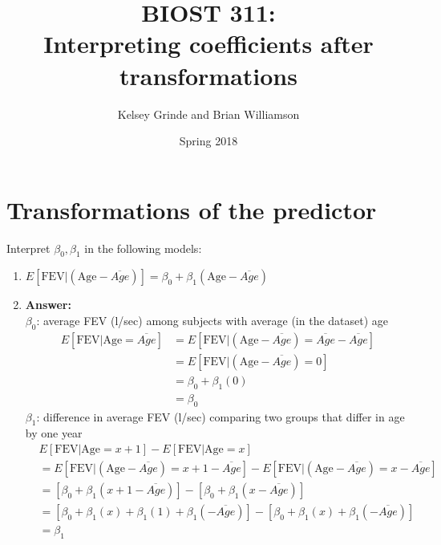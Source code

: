 \documentclass{article}
\begin{document}
\title{BIOST 311: \\ Interpreting coefficients after transformations}
\author{Kelsey Grinde and Brian Williamson}
\date{Spring 2018}

\maketitle

\section{Transformations of the predictor}

Interpret $\beta_0, \beta_1$ in the following models:

\begin{enumerate}\itemsep +5pt
\item $E[\text{FEV}|\left(\text{Age}-\overline{Age}\right)] = \beta_0 + \beta_1 \left(\text{Age}-\overline{Age}\right)$ 
\item[] \color{blue} \textbf{Answer:} \\
$\beta_0$: average FEV (l/sec) among subjects with average (in the dataset) age \\
\begin{align*}
E[\text{FEV}|\text{Age} = \overline{Age}] &= E[\text{FEV}|\left(\text{Age}-\overline{Age}\right)=\overline{Age}-\overline{Age}]\\
& = E[\text{FEV}|\left(\text{Age}-\overline{Age}\right) =0]\\
& = \beta_0+ \beta_1(0) \\
& = \beta_0
\end{align*}
$\beta_1$: difference in average FEV (l/sec) comparing two groups that differ in age by one year
\begin{align*}
&E[\text{FEV}|\text{Age} = x + 1] - E[\text{FEV}|\text{Age} = x ] \\
&=E[\text{FEV}|\left(\text{Age}-\overline{Age}\right)= x + 1 - \overline{Age}] - E[\text{FEV}|\left(\text{Age}-\overline{Age}\right)= x  - \overline{Age}]\\
&=\left[\beta_0 + \beta_1\left( x + 1 - \overline{Age}\right)\right] - \left[\beta_0 + \beta_1\left( x  - \overline{Age}\right)\right] \\
&=\left[\beta_0 + \beta_1(x) + \beta_1 (1)  +\beta_1(-\overline{Age})\right] -\left[\beta_0 + \beta_1(x)  +\beta_1(-\overline{Age})\right]\\
& = \beta_1
\end{align*}
\color{black}


\end{enumerate}
\end{document}
